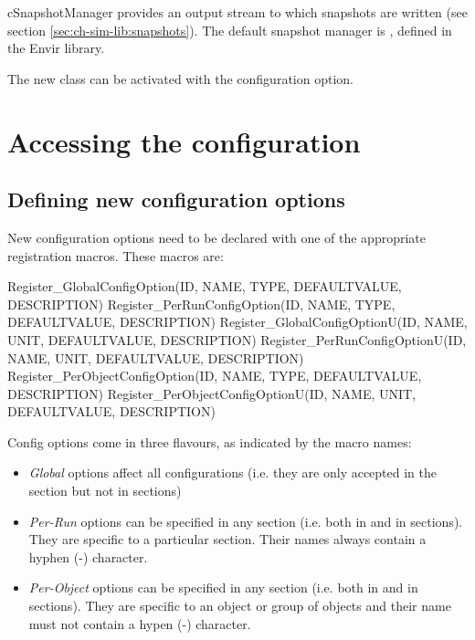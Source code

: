 cSnapshotManager provides an output stream to which snapshots are written
(see section \ref{sec:ch-sim-lib:snapshots}). The default snapshot manager
is , defined in the Envir library.

The new class can be activated with the 
configuration option.


\section{Accessing the configuration}
\label{sec:plugin-exts:accessing-config}

\subsection{Defining new configuration options}

New configuration options need to be declared with one of the appropriate
registration macros. These macros are:

\begin{cpp}
Register_GlobalConfigOption(ID, NAME, TYPE, DEFAULTVALUE, DESCRIPTION)
Register_PerRunConfigOption(ID, NAME, TYPE, DEFAULTVALUE, DESCRIPTION)
Register_GlobalConfigOptionU(ID, NAME, UNIT, DEFAULTVALUE, DESCRIPTION)
Register_PerRunConfigOptionU(ID, NAME, UNIT, DEFAULTVALUE, DESCRIPTION)
Register_PerObjectConfigOption(ID, NAME, TYPE, DEFAULTVALUE, DESCRIPTION)
Register_PerObjectConfigOptionU(ID, NAME, UNIT, DEFAULTVALUE, DESCRIPTION)
\end{cpp}

Config options come in three flavours, as indicated by the macro names:

\begin{itemize}
  \item \textit{Global} options affect all configurations (i.e. they are
      only accepted in the \ttt{[General]} section but not in
       sections)
  \item \textit{Per-Run} options can be specified in any section
      (i.e. both in \ttt{[General]} and in  sections).
      They are specific to a particular section. Their names always contain
      a hyphen (-) character.
  \item \textit{Per-Object} options can be specified in any section
      (i.e. both in \ttt{[General]} and in  sections).
      They are specific to an object or group of objects and their name must
      not contain a hypen (-) character.
\end{itemize}

